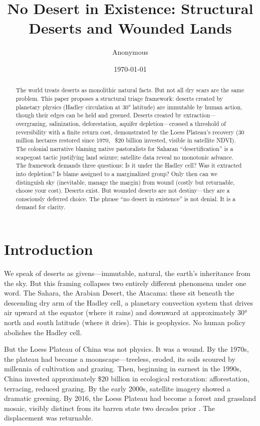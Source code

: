 \documentclass[12pt,a4paper]{article}
\title{No Desert in Existence: Structural Deserts and Wounded Lands}
\author{Anonymous}
\date{\today}
\begin{document}
\maketitle

\begin{abstract}
The world treats deserts as monolithic natural facts. But not all dry scars are the same problem. This paper proposes a structural triage framework: deserts created by planetary physics (Hadley circulation at 30° latitude) are immutable by human action, though their edges can be held and greened. Deserts created by extraction—overgrazing, salinization, deforestation, aquifer depletion—crossed a threshold of reversibility with a finite return cost, demonstrated by the Loess Plateau's recovery (30 million hectares restored since 1970, ~\$20 billion invested, visible in satellite NDVI). The colonial narrative blaming native pastoralists for Saharan ``desertification'' is a scapegoat tactic justifying land seizure; satellite data reveal no monotonic advance. The framework demands three questions: Is it under the Hadley cell? Was it extracted into depletion? Is blame assigned to a marginalized group? Only then can we distinguish sky (inevitable, manage the margin) from wound (costly but returnable, choose your cost). Deserts exist. But wounded deserts are not destiny—they are a consciously deferred choice. The phrase ``no desert in existence'' is not denial. It is a demand for clarity.
\end{abstract}

\section{Introduction}

We speak of deserts as givens—immutable, natural, the earth's inheritance from the sky. But this framing collapses two entirely different phenomena under one word. The Sahara, the Arabian Desert, the Atacama: these sit beneath the descending dry arm of the Hadley cell, a planetary convection system that drives air upward at the equator (where it rains) and downward at approximately 30° north and south latitude (where it dries). This is geophysics. No human policy abolishes the Hadley cell.

But the Loess Plateau of China was not physics. It was a wound. By the 1970s, the plateau had become a moonscape—treeless, eroded, its soils scoured by millennia of cultivation and grazing. Then, beginning in earnest in the 1990s, China invested approximately \$20 billion in ecological restoration: afforestation, terracing, reduced grazing. By the early 2000s, satellite imagery showed a dramatic greening. By 2016, the Loess Plateau had become a forest and grassland mosaic, visibly distinct from its barren state two decades prior \citep{Feng:2016}. The displacement was returnable.
\end{document}
